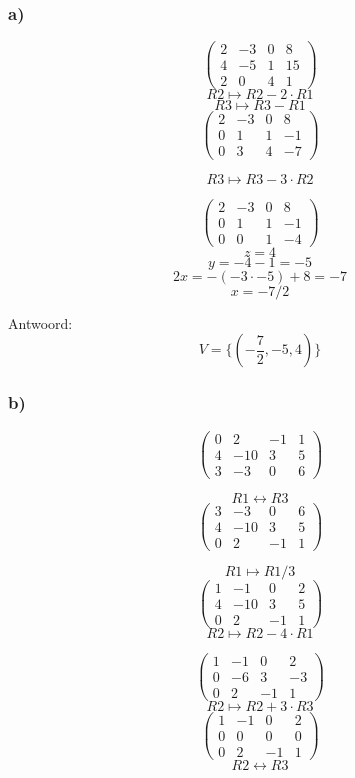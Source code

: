 \documentclass[lineaire_algebra_oplossingen.tex]{subfiles}
\begin{document}
\subsubsection*{a)}
\[
\begin{pmatrix}
2 & -3 & 0 & 8\\
4 & -5 & 1 & 15\\
2 & 0 & 4 & 1
\end{pmatrix}
\]
\[ R2 \longmapsto R2 - 2\cdot R1\]
\[ R3 \longmapsto R3 -  R1\]
\[
\begin{pmatrix}
2 & -3 & 0 & 8\\
0 & 1 & 1 & -1\\
0 & 3 & 4 & -7
\end{pmatrix}
\]

\[ R3 \longmapsto R3 - 3\cdot R2\]

\[
\begin{pmatrix}
2 & -3 & 0 & 8\\
0 & 1 & 1 & -1\\
0 & 0 & 1 & -4
\end{pmatrix}
\]
\[
z = 4\]
\[y = -4-1 = -5\]
\[2x = -(-3\cdot -5) + 8=-7\]
\[ x = -7/2\]

Antwoord:
\[
V = \{(-\frac{7}{2},-5,4)\}
\]

\subsubsection*{b)}
\[
\begin{pmatrix}
0 & 2 & -1 & 1\\
4 & -10 & 3 & 5\\
3 & -3 & 0 & 6
\end{pmatrix}
\]

\[ R1 \leftrightarrow R3\]
\[
\begin{pmatrix}
3 & -3 & 0 & 6\\
4 & -10 & 3 & 5\\
0 & 2 & -1 & 1
\end{pmatrix}
\]

\[ R1 \longmapsto R1 / 3\]
\[
\begin{pmatrix}
1 & -1 & 0 & 2\\
4 & -10 & 3 & 5\\
0 & 2 & -1 & 1
\end{pmatrix}
\]
\[ R2 \longmapsto R2 - 4\cdot R1\]

\[
\begin{pmatrix}
1 & -1 & 0 & 2\\
0 & -6 & 3 & -3\\
0 & 2 & -1 & 1
\end{pmatrix}
\]
\[ R2 \longmapsto R2 + 3\cdot R3\]
\[
\begin{pmatrix}
1 & -1 & 0 & 2\\
0 & 0 & 0 & 0\\
0 & 2 & -1 & 1
\end{pmatrix}
\]
\[ R2 \leftrightarrow R3\]
\end{document}

